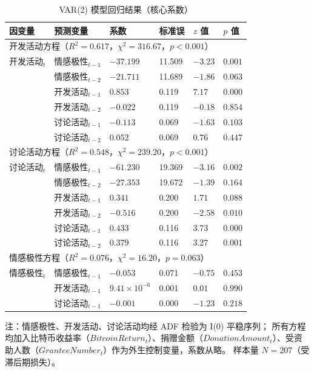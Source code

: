 \documentclass[
    type = master, %
    degree = professional,        %
    decl-page,  %
    twoside,                %
    fontset = fandol %
  ]{njuthesis}
\renewcommand{\footnotesize}{\zihao{-5}}
\begin{document}
\begin{table}[htbp]
    \centering
    \caption{VAR(2) 模型回归结果（核心系数）}
    \label{tab:var-results}
    \small
    \begin{tabularx}{\textwidth}{p{3.2cm}p{3.2cm}XXXX}
        \toprule
        因变量 & 预测变量 & 系数 & 标准误 & $z$ 值 & $p$ 值 \\
        \midrule
        \multicolumn{6}{l}{开发活动方程（$R^2 = 0.617$，$\chi^2 = 316.67$，$p < 0.001$）} \\[2pt]
        开发活动$_t$ & 情感极性$_{t-1}$ & $-37.199$ & 11.509 & $-3.23$ & $0.001$ \\
                 & 情感极性$_{t-2}$ & $-21.711$ & 11.689 & $-1.86$ & $0.063$ \\
                 & 开发活动$_{t-1}$      & $0.853$   & 0.119  & $7.17$  & $0.000$ \\
                 & 开发活动$_{t-2}$      & $-0.022$  & 0.119  & $-0.18$ & $0.854$ \\
                 & 讨论活动$_{t-1}$   & $-0.113$  & 0.069  & $-1.63$ & $0.103$ \\
                 & 讨论活动$_{t-2}$   & $0.052$   & 0.069  & $0.76$  & $0.447$ \\[6pt]
        \multicolumn{6}{l}{讨论活动方程（$R^2 = 0.548$，$\chi^2 = 239.20$，$p < 0.001$）} \\[2pt]
        讨论活动$_t$ & 情感极性$_{t-1}$ & $-61.230$ & 19.369 & $-3.16$ & $0.002$ \\
                    & 情感极性$_{t-2}$ & $-27.353$ & 19.672 & $-1.39$ & $0.164$ \\
                    & 开发活动$_{t-1}$      & $0.341$   & 0.200  & $1.71$  & $0.088$ \\
                    & 开发活动$_{t-2}$      & $-0.516$  & 0.200  & $-2.58$ & $0.010$ \\
                    & 讨论活动$_{t-1}$   & $0.433$   & 0.116  & $3.73$  & $0.000$ \\
                    & 讨论活动$_{t-2}$   & $0.379$   & 0.116  & $3.27$  & $0.001$ \\[6pt]
        \multicolumn{6}{l}{情感极性方程（$R^2 = 0.076$，$\chi^2 = 16.20$，$p = 0.063$）} \\[2pt]
        情感极性$_t$ & 情感极性$_{t-1}$ & $-0.053$ & 0.071 & $-0.75$ & $0.453$ \\
                      & 开发活动$_{t-1}$      & $9.41\times10^{-6}$ & 0.001 & $0.01$ & $0.990$ \\
                      & 讨论活动$_{t-1}$   & $-0.001$ & 0.000 & $-1.23$ & $0.218$ \\
        \bottomrule
    \end{tabularx}
    \begin{minipage}{\textwidth}
        \vspace{0.3em}
        \footnotesize 注：情感极性、开发活动、讨论活动均经 ADF 检验为 I(0) 平稳序列；
              所有方程均加入比特币收益率（$\mathit{BitcoinReturn}_t$）、捐赠金额（$\mathit{DonationAmount}_t$）、受资助人数（$\mathit{GranteeNumber}_t$）作为外生控制变量，系数从略。
              样本量 $N = 207$（受滞后期损失）。
    \end{minipage}
\end{table}
\end{document}
